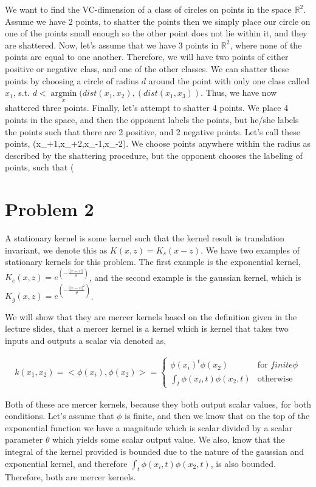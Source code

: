 \documentclass[paper=a4, fontsize=11pt]{scrartcl} %
\begin{document}
We want to find the VC-dimension of a class of circles on points in the space $\mathbb{R}^2$.  Assume we have 2 points, to shatter the points then we simply place our circle on one of the points small enough so the other point does not lie within it, and they are shattered.  Now, let's assume that we have 3 points in $\mathbb{R}^2$, where none of the points are equal to one another.  Therefore, we will have two points of either positive or negative class, and one of the other classes.  We can shatter these points by choosing a circle of radius $d$ around the point with only one class called $x_1$, s.t. $d<\underset{x}{\operatorname{argmin}}(dist(x_1,x_2),(dist(x_1,x_3))$.  Thus, we have now shattered three points. Finally, let's attempt to shatter 4 points.  We place 4 points in the space, and then the opponent labels the points, but he/she labels the points such that there are 2 positive, and 2 negative points.  Let's call these points, (x_{+1},x_{+2},x_{-1},x_{-2}).  We choose points anywhere within the radius as described by the shattering procedure, but the opponent chooses the labeling of points, such that (


\section{Problem 2}

A stationary kernel is some kernel such that the kernel result is translation invariant, we denote this as $K(x,z) = K_s(x-z)$.  We have two examples of stationary kernels for this problem.  The first example is the exponential kernel, $K_e(x,z) = e^{(-\frac{||x-z||}{\theta})}$, and the second example is the gaussian kernel, which is $K_g(x,z) = e^{(-\frac{||x-z||^2}{\theta})}$.

We will show that they are mercer kernels based on the definition given in the lecture slides, that a mercer kernel is a kernel which is kernel that takes two inputs and outputs a scalar via denoted as,

\begin{align}
k(x_1,x_2) = <\phi(x_i),\phi(x_2)> = \left\{
	\begin{array}{ll}
		\phi(x_i)^t\phi(x_2) & \mbox{for } finite \phi \\
		\int_t \phi(x_i,t)\phi(x_2,t) & \mbox{otherwise} 
	\end{array}
\right.
\end{align} 

Both of these are mercer kernels, because they both output scalar values, for both conditions.
Let's assume that $\phi$ is finite, and then we know that on the top of the exponential function we have a magnitude which is scalar divided by a scalar parameter $\theta$ which yields some scalar output value.
We also, know that the integral of the kernel provided is bounded due to the nature of the gaussian and exponential kernel, and therefore $\int_t \phi(x_i,t)\phi(x_2,t)$, is also bounded.  Therefore, both are mercer kernels.
\end{document}
